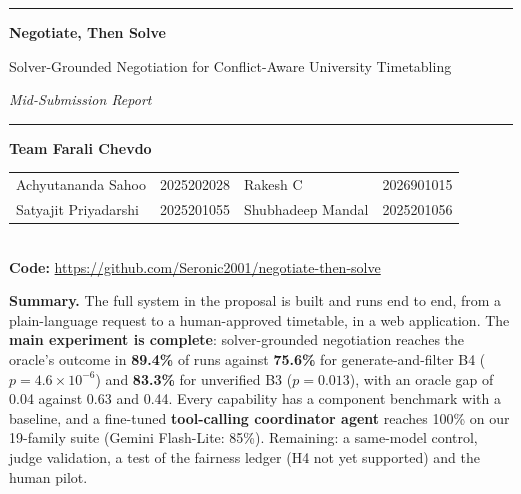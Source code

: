 \documentclass[11pt,a4paper]{article}
\begin{document}
\begin{center}
{\color{secblue}\rule{\textwidth}{0.8pt}}\par\vspace{2pt}
{\Large\bfseries Negotiate, Then Solve\par}
\vspace{2pt}
{\large Solver-Grounded Negotiation for Conflict-Aware University Timetabling\par}
\vspace{1pt}
{\normalsize\itshape Mid-Submission Report\par}
\vspace{2pt}
{\color{secblue}\rule{\textwidth}{0.8pt}}\par
\vspace{3pt}
{\small\textbf{Team Farali Chevdo}\\[2pt]
\begin{tabular}{@{}l@{\;\;}l@{\qquad}l@{\;\;}l@{}}
Achyutananda Sahoo & 2025202028 & Rakesh C & 2026901015\\
Satyajit Priyadarshi & 2025201055 & Shubhadeep Mandal & 2025201056\\
\end{tabular}\\[3pt]
\textbf{Code:} \url{https://github.com/Seronic2001/negotiate-then-solve}\par}
\end{center}

\begin{keybox}
\small\textbf{Summary.} The full system in the proposal is built and runs end to end,
from a plain-language request to a human-approved timetable, in a web application.
The \textbf{main experiment is complete}: solver-grounded negotiation reaches the
oracle's outcome in \textbf{89.4\%} of runs against \textbf{75.6\%} for generate-and-filter
B4 ($p{=}4.6{\times}10^{-6}$) and \textbf{83.3\%} for unverified B3 ($p{=}0.013$), with an
oracle gap of 0.04 against 0.63 and 0.44. Every capability has a component benchmark
with a baseline, and a fine-tuned \textbf{tool-calling coordinator agent} reaches 100\%
on our 19-family suite (Gemini Flash-Lite: 85\%). Remaining: a same-model control,
judge validation, a test of the fairness ledger (H4 not yet supported) and the human pilot.
\end{keybox}

\end{document}
